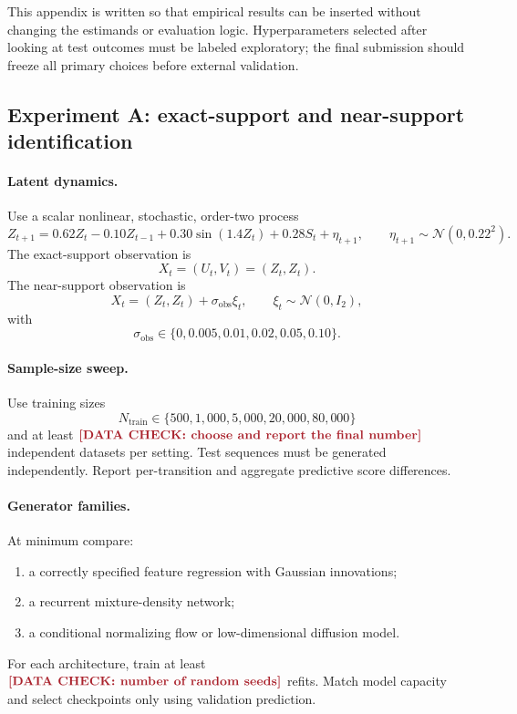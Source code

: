 \documentclass{article}
\newcommand{\dataplaceholder}[1]{%
  \textcolor{placeholderred}{\textbf{[DATA CHECK: #1]}}}
\theoremstyle{remark}
\begin{document}
This appendix is written so that empirical results can be inserted without
changing the estimands or evaluation logic. Hyperparameters selected after
looking at test outcomes must be labeled exploratory; the final submission
should freeze all primary choices before external validation.

\subsection{Experiment A: exact-support and near-support identification}
\label{app:exp-support}

\paragraph{Latent dynamics.}
Use a scalar nonlinear, stochastic, order-two process
\begin{equation}
  Z_{t+1}
  =
  0.62Z_t-0.10Z_{t-1}
  +0.30\sin(1.4Z_t)
  +0.28S_t+\eta_{t+1},
  \qquad
  \eta_{t+1}\sim\mathcal N(0,0.22^2).
  \label{eq:support-dynamics-app}
\end{equation}
The exact-support observation is
\[
  X_t=(U_t,V_t)=(Z_t,Z_t).
\]
The near-support observation is
\[
  X_t=(Z_t,Z_t)+\sigma_{\mathrm{obs}}\xi_t,
  \qquad
  \xi_t\sim\mathcal N(0,I_2),
\]
with
\[
  \sigma_{\mathrm{obs}}
  \in
  \{0,0.005,0.01,0.02,0.05,0.10\}.
\]

\paragraph{Sample-size sweep.}
Use training sizes
\[
  N_{\mathrm{train}}
  \in
  \{500,1{,}000,5{,}000,20{,}000,80{,}000\}
\]
and at least \(\dataplaceholder{choose and report the final number}\)
independent datasets per setting. Test sequences must be generated
independently. Report per-transition and aggregate predictive score
differences.

\paragraph{Generator families.}
At minimum compare:
\begin{enumerate}[leftmargin=1.5em]
  \item a correctly specified feature regression with Gaussian innovations;
  \item a recurrent mixture-density network;
  \item a conditional normalizing flow or low-dimensional diffusion model.
\end{enumerate}
For each architecture, train at least
\(\dataplaceholder{number of random seeds}\) refits. Match model capacity and
select checkpoints only using validation prediction.
\end{document}
